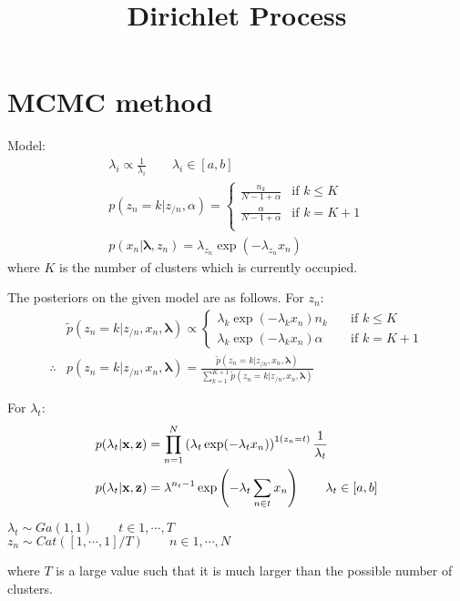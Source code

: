 \documentclass{article}
\title{Dirichlet Process}
\date{}
\begin{document}
\maketitle

\section{MCMC method}
Model:
\begin{align}
\lambda_i\propto\frac{1}{\lambda_i}\qquad \lambda_i\in[a,b]\\
p(z_n=k|z_{/n},\alpha)=\begin{cases}
\frac{n_k}{N-1+\alpha} & \text{if }k\le K\\
\frac{\alpha}{N-1+\alpha} & \text{if }k=K+1\\
\end{cases}\\
p(x_n|\mathbf{\lambda},z_n)=\lambda_{z_n}\exp(-\lambda_{z_n}x_n)
\end{align}
where $K$ is the number of clusters which is currently occupied.

The posteriors on the given model are as follows. For $z_n$:
\begin{align}
\nonumber & \tilde{p}(z_n=k|z_{/n},x_n,\mathbf{\lambda})\propto 
\begin{cases}
\lambda_{k}\exp(-\lambda_{k}x_n) n_k\quad & \text{if }k\le K\\
\lambda_{k}\exp(-\lambda_{k}x_n) \alpha\quad & \text{if }k= K+1
\end{cases}\\
 \therefore & p(z_n=k|z_{/n},x_n,\mathbf{\lambda})=\frac{\tilde{p}(z_n=k|z_{/n},x_n,\mathbf{\lambda})}{\sum_{k=1}^{K+1}\tilde{p}(z_n=k|z_{/n},x_n,\mathbf{\lambda})}
\end{align}


For $\lambda_t$:
\begin{align}
\nonumber & p(\lambda_t|\mathbf{x},\mathbf{z})=\prod_{n=1}^{N}\left(\lambda_t\exp(-\lambda_t x_n)\right)^{1(z_n=t)}\frac{1}{\lambda_t}\\
& p(\lambda_t|\mathbf{x},\mathbf{z})=\lambda^{n_t-1}\exp\left(-\lambda_t\sum_{n\in t} x_n\right)\qquad \lambda_t\in [a,b]
\end{align}

\begin{algorithm}
    \KwData{$\alpha$,$\cy$}
    $\lambda_t\sim Ga(1,1) \qquad t\in{1,\cdots,T}$\\
    $z_n\sim Cat([1,\cdots,1]/T) \qquad n\in{1,\cdots,N}$\\
\end{algorithm}
where $T$ is a large value such that it is much larger than the possible number of clusters.
\end{document}
